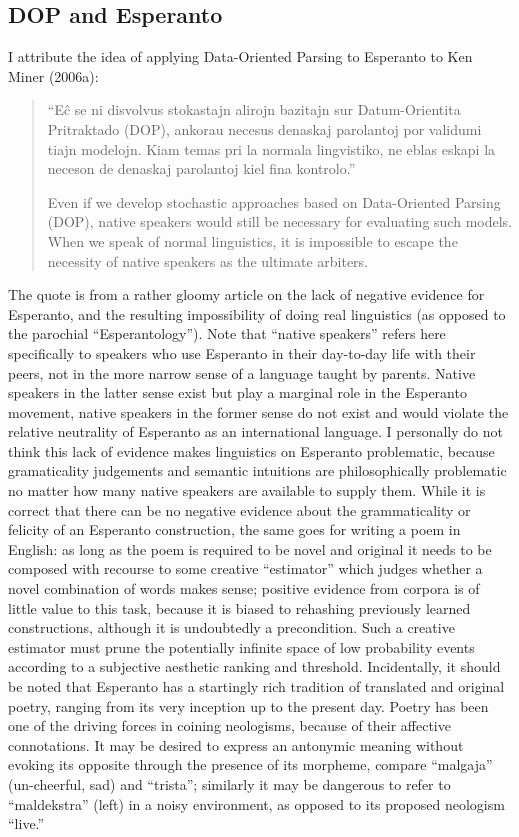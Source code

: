 \documentclass[10pt,a4paper]{article}
\begin{document}
\subsection{DOP and Esperanto}

I attribute the idea of applying Data-Oriented Parsing to Esperanto to
Ken Miner (2006a):

\begin{quote}
	``E\^c se ni disvolvus stokastajn alirojn bazitajn sur Datum-Orientita
	Pritraktado (DOP), ankorau necesus denaskaj parolantoj por validumi
	tiajn modelojn. Kiam temas pri la normala lingvistiko, ne eblas eskapi
	la neceson de denaskaj parolantoj kiel fina kontrolo.''

	Even if we develop stochastic approaches based on Data-Oriented
	Parsing (DOP), native speakers would still be necessary for evaluating
	such models. When we speak of normal linguistics, it is impossible
	to escape the necessity of native speakers as the ultimate arbiters.
\end{quote}

The quote is from a rather gloomy article on the lack of negative evidence
for Esperanto, and the resulting impossibility of doing real linguistics (as
opposed to the parochial ``Esperantology''). Note that ``native speakers''
refers here specifically to speakers who use Esperanto in their day-to-day
life with their peers, not in the more narrow sense of a language taught by
parents. Native speakers in the latter sense exist but play a marginal role in
the Esperanto movement, native speakers in the former sense do not exist and
would violate the relative neutrality of Esperanto as an international
language. I personally do not think this lack of evidence makes linguistics on
Esperanto problematic, because gramaticality judgements and semantic
intuitions are philosophically problematic no matter how many native speakers
are available to supply them. While it is correct that there can be no
negative evidence about the grammaticality or felicity of an Esperanto
construction, the same goes for writing a poem in English: as long as the poem
is required to be novel and original it needs to be composed with recourse to
some creative ``estimator'' which judges whether a novel combination of words
makes sense; positive evidence from corpora is of little value to this task,
because it is biased to rehashing previously learned constructions, although
it is undoubtedly a precondition.  Such a creative estimator must prune the
potentially infinite space of low probability events according to a subjective
aesthetic ranking and threshold. Incidentally, it should be noted that
Esperanto has a startingly rich tradition of translated and original poetry,
ranging from its very inception up to the present day.  Poetry has been one
of the driving forces in coining neologisms, because of their affective
connotations. It may be desired to express an antonymic meaning without
evoking its opposite through the presence of its morpheme, compare ``malgaja''
(un-cheerful, sad) and ``trista''; similarly it may be dangerous to refer to
``maldekstra'' (left) in a noisy environment, as opposed to its proposed
neologism ``live.''
\end{document}
